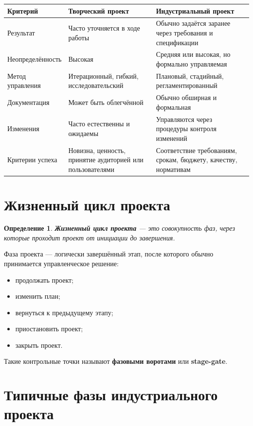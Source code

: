 \documentclass[12pt,a4paper]{article}
\newtheorem{definition}{Определение}
\begin{document}
\begin{longtable}{|p{}|p{}|p{}|}
\hline
\textbf{Критерий} & \textbf{Творческий проект} & \textbf{Индустриальный проект} \\
\hline
Результат & Часто уточняется в ходе работы & Обычно задаётся заранее через требования и спецификации \\
\hline
Неопределённость & Высокая & Средняя или высокая, но формально управляемая \\
\hline
Метод управления & Итерационный, гибкий, исследовательский & Плановый, стадийный, регламентированный \\
\hline
Документация & Может быть облегчённой & Обычно обширная и формальная \\
\hline
Изменения & Часто естественны и ожидаемы & Управляются через процедуры контроля изменений \\
\hline
Критерии успеха & Новизна, ценность, принятие аудиторией или пользователями & Соответствие требованиям, срокам, бюджету, качеству, нормативам \\
\hline
\end{longtable}

\section{Жизненный цикл проекта}

\begin{definition}
\textbf{Жизненный цикл проекта} --- это совокупность фаз, через которые проходит проект от инициации до завершения.
\end{definition}

Фаза проекта --- логически завершённый этап, после которого обычно принимается управленческое решение:
\begin{itemize}
    \item продолжать проект;
    \item изменить план;
    \item вернуться к предыдущему этапу;
    \item приостановить проект;
    \item закрыть проект.
\end{itemize}

Такие контрольные точки называют \textbf{фазовыми воротами} или \textbf{stage-gate}.

\section{Типичные фазы индустриального проекта}
\end{document}
